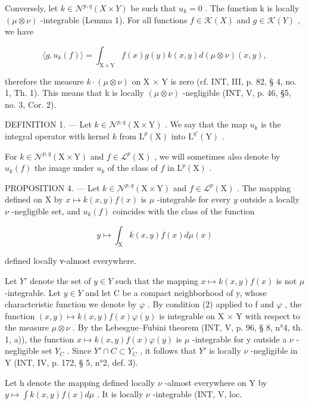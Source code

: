 Conversely, let \(k \in \mathcal{N}^{p,q}(X \times Y)\) be such that \(u_k = 0\) . The function k is locally \((\mu \otimes \nu)\) -integrable (Lemma 1). For all functions \(f \in \mathcal{K}(X)\) and \(g \in \mathcal{K}(Y)\) , we have

\[
\langle g, u _ {k} (f) \rangle = \int_ {\mathrm{X} \times \mathrm{Y}} f (x) g (y) k (x, y) d (\mu \otimes \nu) (x, y),
\]

therefore the measure \(k \cdot (\mu \otimes \nu)\) on X × Y is zero (cf. INT, III, p. 82, § 4, no. 1, Th. 1). This means that k is locally \((\mu \otimes \nu)\) -negligible (INT, V, p. 46, §5, no. 3, Cor. 2).

DEFINITION 1. --- Let \(k \in \mathcal{N}^{p,q}(\mathrm{X} \times \mathrm{Y})\) . We say that the map \(u_k\) is the integral operator with kernel \(k\) from \(\mathrm{L}^p(\mathrm{X})\) into \(\mathrm{L}^{q'}(\mathrm{Y})\) .

For \(k \in \mathcal{N}^{p,q}(\mathrm{X} \times \mathrm{Y})\) and \(f \in \mathcal{L}^p(\mathrm{X})\) , we will sometimes also denote by \(u_k(f)\) the image under \(u_k\) of the class of \(f\) in \(\mathrm{L}^p(\mathrm{X})\) .

PROPOSITION 4. --- Let \(k \in \mathcal{N}^{p,q}(\mathrm{X} \times \mathrm{Y})\) and \(f \in \mathcal{L}^p(\mathrm{X})\) . The mapping defined on \(\mathrm{X}\) by \(x \mapsto k(x,y)f(x)\) is \(\mu\) -integrable for every \(y\) outside a locally \(\nu\) -negligible set, and \(u_k(f)\) coincides with the class of the function

\[
y \mapsto \int_ {\mathrm{X}} k (x, y) f (x) d \mu (x)
\]

defined locally ν-almost everywhere.

Let \(Y'\) denote the set of \(y \in Y\) such that the mapping \(x \mapsto k(x, y)f(x)\) is not \(\mu\) -integrable. Let \(y \in Y\) and let C be a compact neighborhood of y, whose characteristic function we denote by \(\varphi\) . By condition (2) applied to f and \(\varphi\) , the function \((x, y) \mapsto k(x, y)f(x)\varphi(y)\) is integrable on X × Y with respect to the measure \(\mu \otimes \nu\) . By the Lebesgue--Fubini theorem (INT, V, p. 96, § 8, n°4, th. 1, a)), the function \(x \mapsto k(x, y)f(x)\varphi(y)\) is \(\mu\) -integrable for y outside a \(\nu\) -negligible set \(Y_{C}\) . Since \(Y' \cap C \subset Y_{C}\) , it follows that \(Y'\) is locally \(\nu\) -negligible in Y (INT, IV, p. 172, § 5, n°2, def. 3).

Let h denote the mapping defined locally \(\nu\) -almost everywhere on Y by \(y \mapsto \int k(x, y)f(x)d\mu\) . It is locally \(\nu\) -integrable (INT, V, loc.

